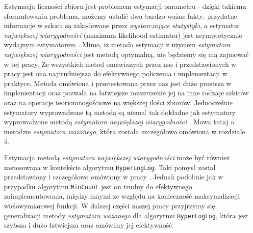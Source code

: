        Estymacja liczności zbioru jest problemem estymacji parametru - dzięki takiemu sformułowaniu problemu, możemy ustalić dwa bardzo ważne fakty: przydatne informacje w szkicu są zakodowane przez \textit{wystarczające statystyki}, a estymator \textit{największej wiarygodności} (maximum likelihood estimator) jest asymptotycznie wydajnym estymatorem \cite{ting}. Mimo, iż metoda estymacji z użyciem \textit{estymatora największej wiarygodności} jest metodą optymalną, nie będziemy się nią zajmować w tej pracy. Ze wszystkich metod omawianych przez nas i przedstawionych w pracy \cite{ting} jest ona najtrudniejsza do efektywnego policzenia i implementacji w praktyce. Metoda omówiona i przetestowana przez nas jest dużo prostsza w implementacji oraz pozwala na łatwiejsze rozszerzenie jej na inne rodzaje szkiców oraz na operacje teoriomnogościowe na większej ilości zbiorów. Jednocześnie estymatory wyprowadzone tą metodą są niemal tak dokładne jak estymatory wyprowadzone metodą \textit{estymatora największej wiarygodności} \cite{ting}. Mowa tutaj o metodzie \textit{estymatora ważonego}, która została szczegółowo omówiona w rozdziale 4.
       
       Estymacja metodą \textit{estymatora największej wiarygodności} może być również zastosowana w kontekście algorytmu \texttt{HyperLogLog}. Taki pomysł został przedstawiony i szczegółowo omówiony w pracy \cite{oertl}. Jednak podobnie jak w przypadku algorytmu \texttt{MinCount} jest on trudny do efektywnego zaimplementowania, między innymi ze względu na konieczność maksymalizacji wielowymiarowej funkcji. W dalszej części naszej pracy przyjrzymy się generalizacji metody \textit{estymatora ważonego} dla algorytmu \texttt{HyperLogLog}, która jest szybsza i dużo łatwiejsza oraz omówimy jej efektywność.
  